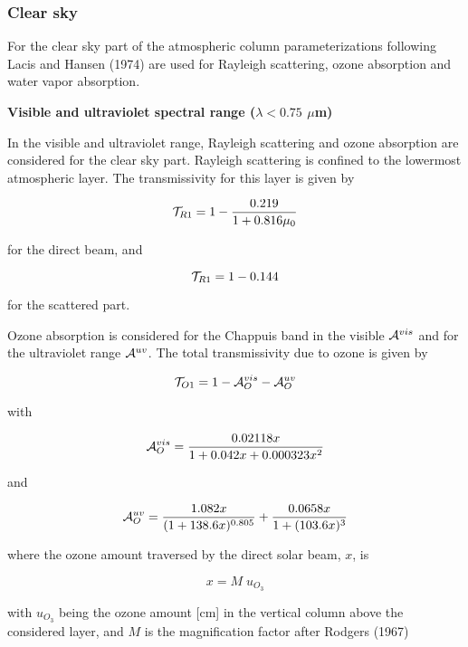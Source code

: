 \subsubsection*{Clear sky}

For the clear sky part of the atmospheric column 
parameterizations following Lacis and Hansen
(1974) are used for Rayleigh scattering, ozone
absorption and water vapor absorption.

{\bf Visible and ultraviolet spectral range ($\lambda <
0.75$ 
$\mu$m)} 

In the visible and ultraviolet  range, Rayleigh
scattering and ozone absorption are considered for
the clear sky part. Rayleigh scattering is confined to
the lowermost atmospheric layer. The
transmissivity for this layer is given by

\begin{equation}
{\cal T}_{R1}=1 - \frac{0.219}{1+0.816\mu_0}
\end{equation}

for the direct beam, and

\begin{equation}
{\cal T}_{R1}=1 - 0.144
\end{equation}

for the scattered part.

Ozone absorption is considered for the Chappuis band
in the visible ${\cal A}^{vis}$ and for the
ultraviolet range ${\cal A}^{uv}$. The total transmissivity
due to ozone is given by 

\begin{equation}
{\cal T}_{O1} = 1 - {\cal A}^{vis}_O - {\cal A}^{uv}_O
\end{equation}

with 

\begin{equation}
{\cal A}^{vis}_O = \frac{
0.02118x}{1+0.042x+0.000323x^2}
\end{equation}

and

\begin{equation}
{\cal A}^{uv}_O=\frac{1.082x}{(1+138.6x)^{0.805}}+\frac{
0.0658x}{1+(103.6x)^3}
\end{equation}

where the ozone amount traversed by the direct solar
beam, $x$, is

\begin{equation}
x=M \; u_{O_3}
\end{equation}

with $u_{O_3}$ being the ozone amount [cm] in the
vertical column above the considered
layer, and $M$ is the magnification factor after
Rodgers (1967)

